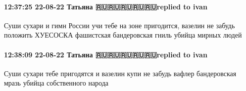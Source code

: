  
 
 
 
 

\paragraph{12:37:25 22-08-22 Татьяна 🇷🇺🇷🇺🇷🇺🇷🇺🇷🇺replied to ivan}

Суши сухари и гимн России учи тебе на зоне пригодится, вазелин не забудь
положить ХУЕСОСКА фашистская бандеровская гниль убийца мирных людей

\paragraph{12:38:09 22-08-22 Татьяна 🇷🇺🇷🇺🇷🇺🇷🇺🇷🇺replied to ivan}

Суши сухари тебе пригодятся и вазелин купи не забудь вафлер бандеровская мразь
убийца собственного народа
